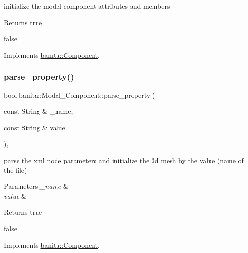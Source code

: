 initialize the model component attributes and members 

\begin{DoxyReturn}{Returns}
true 

false 
\end{DoxyReturn}


Implements \mbox{\hyperlink{classbanita_1_1_component_a2f700c071185f7033caa69576dafa9e7}{banita\+::\+Component}}.

\mbox{\label{classbanita_1_1_model___component_a1a6acbf643bd87acabfc2a31b7be4db8}} 
\subsubsection{\texorpdfstring{parse\_property()}{parse\_property()}}
{\footnotesize\ttfamily bool banita\+::\+Model\+\_\+\+Component\+::parse\+\_\+property (\begin{DoxyParamCaption}\item[{const String \&}]{\+\_\+name,  }\item[{const String \&}]{value }\end{DoxyParamCaption})\hspace{0.3cm}{\ttfamily [override]}, {\ttfamily [virtual]}}



parse the xml node parameters and initialize the 3d mesh by the value (name of the file) 


\begin{DoxyParams}{Parameters}
{\em \+\_\+name} & \\
\hline
{\em value} & \\
\hline
\end{DoxyParams}
\begin{DoxyReturn}{Returns}
true 

false 
\end{DoxyReturn}


Implements \mbox{\hyperlink{classbanita_1_1_component_a619154ef2bed8e4493413bdef6117716}{banita\+::\+Component}}.

\mbox{\label{classbanita_1_1_model___component_ab8acac6bf05bc01a8529235904b81a5b}} 
